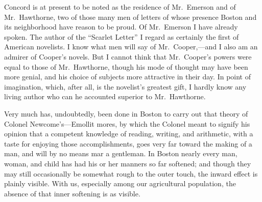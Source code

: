 Concord is at present to be noted as the residence of Mr.\ Emerson
and of Mr.\ Hawthorne, two of those many men of letters of whose
presence Boston and its neighborhood have reason to be proud.  Of
Mr.\ Emerson I have already spoken.  The author of the ``Scarlet
Letter'' I regard as certainly the first of American novelists.  I
know what men will say of Mr.\ Cooper,---and I also am an admirer of
Cooper's novels.  But I cannot think that Mr.\ Cooper's powers were
equal to those of Mr.\ Hawthorne, though his mode of thought may
have been more genial, and his choice of subjects more attractive
in their day.  In point of imagination, which, after all, is the
novelist's greatest gift, I hardly know any living author who can
he accounted superior to Mr.\ Hawthorne.

Very much has, undoubtedly, been done in Boston to carry out that
theory of Colonel Newcome's---Emollit mores, by which the Colonel
meant to signify his opinion that a competent knowledge of reading,
writing, and arithmetic, with a taste for enjoying those
accomplishments, goes very far toward the making of a man, and will
by no means mar a gentleman.  In Boston nearly every man, woman,
and child has had his or her manners so far softened; and though
they may still occasionally be somewhat rough to the outer touch,
the inward effect is plainly visible.  With us, especially among
our agricultural population, the absence of that inner softening is
as visible.

